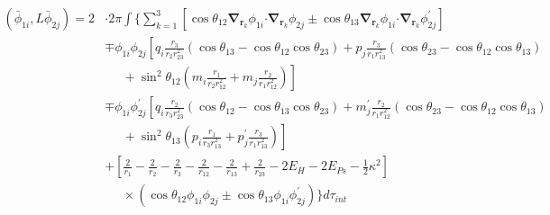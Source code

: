 \documentclass[Dissertation.tex]{subfiles}
\begin{document}
\begin{align}
\label{eq:PWavePhi1Phi2}
\left(\bar{\phi}_{1i},L \bar{\phi}_{2j}\right) = 2 & \cdot 2\pi \int \Bigg\{ \sum_{k=1}^3 \left[ \cos\theta_{12} \boldsymbol{\nabla}_{\!\mathbf{r}_k} \nonumber \phi_{1i} \boldsymbol{\cdot} \boldsymbol{\nabla}_{\!\mathbf{r}_k} \phi_{2j} \pm \cos\theta_{13} \boldsymbol{\nabla}_{\!\mathbf{r}_k} \phi_{1i} \boldsymbol{\cdot} \boldsymbol{\nabla}_{\!\mathbf{r}_k} \phi_{2j}^\prime \right] \\
 \nonumber &\mp \phi_{1i} \phi_{2j} \left[q_i \frac{r_3}{r_2 r_{23}^2} (\cos\theta_{13} - \cos\theta_{12} \cos\theta_{23}) + p_j \frac{r_3}{r_1 r_{13}^2}(\cos\theta_{23}-\cos\theta_{12} \cos\theta_{13})\right.\\
 \nonumber & \left. \;\;\;\;\;  + \sin^2\theta_{12} \left(m_i \frac{r_1}{r_2 r_{12}^2} + m_j \frac{r_2}{r_1 r_{12}^2} \right) \right] \\
 \nonumber &\mp \phi_{1i} \phi_{2j}^\prime \left[q_i \frac{r_2}{r_3 r_{23}^2} (\cos\theta_{12} - \cos\theta_{13} \cos\theta_{23}) + m_j^\prime \frac{r_2}{r_1 r_{12}^2}(\cos\theta_{23}-\cos\theta_{12} \cos\theta_{13})\right.\\
 \nonumber & \left. \;\;\;\;\;  + \sin^2\theta_{13} \left(p_i \frac{r_1}{r_3 r_{13}^2} + p_j^\prime \frac{r_3}{r_1 r_{13}^2} \right) \right] \\
 \nonumber &+ \left. \left[\frac{2}{r_1} - \frac{2}{r_2} - \frac{2}{r_3} - \frac{2}{r_{12}} - \frac{2}{r_{13}} + \frac{2}{r_{23}} - 2 E_H - 2 E_{Ps} - \frac{1}{2}\kappa^2 \right] \right. \\
 &\;\;\;\;\; \times \left(\cos\theta_{12} \phi_{1i} \phi_{2j} \pm \cos\theta_{13} \phi_{1i} \phi_{2j}^\prime \right) \Bigg\} d\tau_{int}
\end{align}
\end{document}
